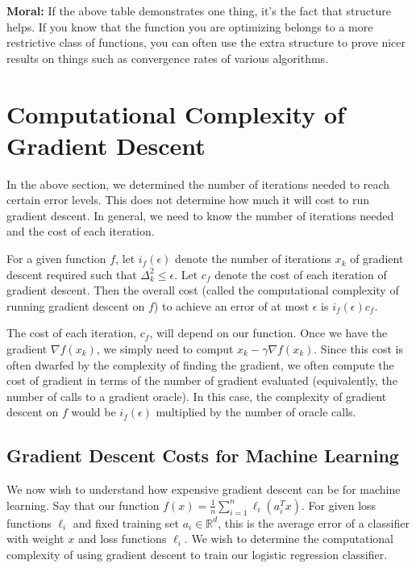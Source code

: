 \documentclass[12pt]{report}
\def\real{\mathbb R}
\begin{document}
\medskip

{\bf Moral:} If the above table demonstrates one thing, it's the fact that structure helps. If you know that the function you are optimizing belongs to a more restrictive class of functions, you can often use the extra structure to prove nicer results on things such as convergence rates of various algorithms.

\section{Computational Complexity of Gradient Descent}

In the above section, we determined the number of iterations needed to reach certain error levels. This does not determine how much it will cost to run gradient descent. In general, we need to know the number of iterations needed and the cost of each iteration.

\medskip

For a given function $f$, let $i_f(\epsilon)$ denote the number of iterations $x_k$ of gradient descent required such that $\Delta_k^2 \leq \epsilon$. Let $c_f$ denote the cost of each iteration of gradient descent. Then the overall cost (called the computational complexity of running gradient descent on $f$) to achieve an error of at most $\epsilon$ is $i_f(\epsilon)c_f$.

\medskip

The cost of each iteration, $c_f$, will depend on our function. Once we have the gradient $\nabla f(x_k)$, we simply need to comput $x_k - \gamma \nabla f(x_k)$. Since this cost is often dwarfed by the complexity of finding the gradient, we often compute the cost of gradient in terms of the number of gradient evaluated (equivalently, the number of calls to a gradient oracle). In this case, the complexity of gradient descent on $f$ would be $i_f(\epsilon)$ multiplied by the number of oracle calls.

\subsection{Gradient Descent Costs for Machine Learning}

We now wish to understand how expensive gradient descent can be for machine learning. Say that our function $f(x) = \frac{1}{n}\sum_{i=1}^n \ell_i(a_i^Tx)$. For given loss functions $\ell_i$ and fixed training set $a_i \in \real^d$, this is the average error of a classifier with weight $x$ and loss functions $\ell_i$. We wish to determine the computational complexity of using gradient descent to train our logistic regression classifier.
\end{document}

